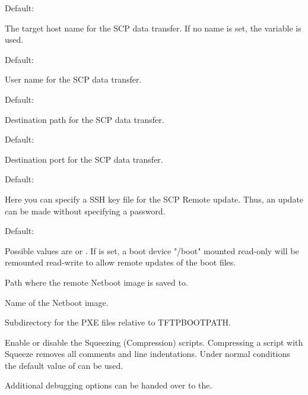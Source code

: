 \begin{description}

  Default: 

  The target host name for the SCP data transfer.
  If no name is set, the variable
   is used.


  Default: 

  User name for the SCP data transfer.


  Default: 

  Destination path for the SCP data transfer.


  Default: 

  Destination port for the SCP data transfer.


  Default: 

  Here you can specify a SSH key file for the SCP Remote update.
  Thus, an update can be made without specifying a password.


  Default: 

  Possible values are  or . If 
  is set, a boot device "/boot" mounted read-only will be remounted
  read-write to allow remote updates of the boot files.


  Path where the remote Netboot image is saved to.


  Name of the Netboot image.


  Subdirectory for the PXE files relative to TFTPBOOTPATH.



   Enable or disable the Squeezing (Compression) scripts.
   Compressing a script with Squeeze removes all comments and line indentations.
   Under normal conditions the default value of  can be used.


   Additional debugging options can be handed over to the.

  \end{description}

